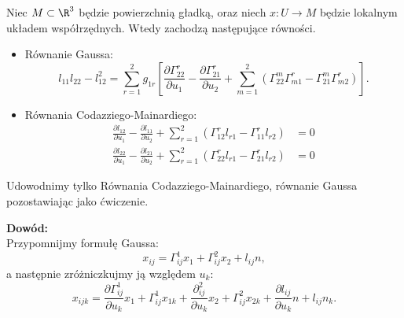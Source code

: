 \begin{frame}[<+->]


\begin{twierdzenie}\label{thm:Gauss-Codazz-Mainard}
Niec $M\subset \R^3$ będzie powierzchnią gładką, oraz niech $x\colon U\to M$ będzie lokalnym układem współrzędnych. Wtedy zachodzą następujące równości.
\begin{itemize}
\item Równanie Gaussa:
\begin{equation*}
l_{11}l_{22}-l_{12}^2=
\sum_{r=1}^{2}g_{1r}
\left[
\frac{\partial \Gamma^r_{22}} {\partial u_{1}}- \frac{\partial\Gamma ^r_{21}}{\partial u_{2}}+
\sum_{m=1}^2 \left(\Gamma^m_{22}\Gamma^r_{m1}-\Gamma^m_{21}\Gamma^r_{m2}\right)\right].
\end{equation*}

\item Równania Codazziego-Mainardiego:
\begin{align*}
\frac{\partial l_{12}}{\partial u_1}-\frac{\partial l_{11}}{\partial u_2} + 
\sum_{r=1}^2 \left( \Gamma^r_{12}l_{r1}-\Gamma^r_{11}l_{r2}\right)&=0\\
\frac{\partial l_{22}}{\partial u_1}-\frac{\partial l_{21}}{\partial u_2} + 
\sum_{r=1}^2 \left( \Gamma^r_{22}l_{r1}-\Gamma^r_{21}l_{r2}\right)&=0
\end{align*}
\end{itemize}
\end{twierdzenie}

\end{frame}
\begin{frame}[<+->]
Udowodnimy tylko Równania Codazziego-Mainardiego, równanie Gaussa pozostawiając jako ćwiczenie.

\pause {}

\pause \textcolor{ared}{\textbf{Dowód:}}\\

Przypomnijmy formułę Gaussa:
\[x_{ij}=\Gamma^1_{ij}x_1+\Gamma^2_{ij}x_2+l_{ij}n,\]\pause
a następnie zróżniczkujmy ją względem $u_k$:
\[x_{ijk}=\frac{\partial \Gamma^1_{ij}}{\partial u_k}x_1+ \Gamma^1_{ij}x_{1k}+ \frac{\partial^2_{ij}}{\partial u_k}x_2 +\Gamma^2_{ij}x_{2k} +\frac{\partial l_{ij}}{\partial u_k}n+l_{ij}n_k.\]

\end{frame}
